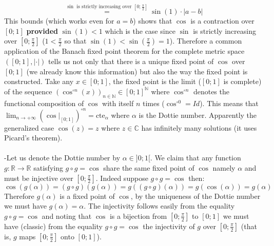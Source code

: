 \begin{solution}
\[    \]
    \[
        \overset{\sin\text{ is strictly increasing over } \left[0;\frac{\pi}{2}\right]}{=}\sin\left(1\right)\cdot|a-b|
    \]
    This bounds (which works even for \( a=b \)) shows that \( \cos \) is a contraction over \( \left[0;1\right] \) \textbf{provided} \( \sin\left(1\right)<1 \) which is the case since \( \sin \) is strictly increasing over \( \left[0;\frac{\pi}{2}\right] \) (\( 1<\frac{\pi}{2} \) so that \( \sin\left(1\right)<\sin\left(\frac{\pi}{2}\right)=1 \)). Therefore a common application of the Banach fixed point theorem for the complete metric space \( \left(\left[0;1\right],|\cdot|\right) \) tells us not only that there is a unique fixed point of \( \cos \) over \( \left[0;1\right] \) (we already know this information) but also the way the fixed point is constructed. Take any \( x\in\left[0;1\right] \), the fixed point is the limit (\( \left[0;1\right] \) is complete) of the sequence \( \left(\cos^{\circ n}\left(x\right)\right)_{n\in\mathbb{N}}\in\left[0;1\right]^{\mathbb{N}} \) where \( \cos^{\circ n} \) denotes the functional composition of \( \cos \) with itself \( n \) times (\( \cos^{\circ 0}=Id \)). This means that \( \lim _{n\rightarrow+\infty}\left(\cos|_{\left[0;1\right]}\right)^{\circ n}=\mathrm{cte}_{\alpha} \) where \( \alpha \) is the Dottie number. Apparently the generalized case \( \cos\left(z\right)=z \) where \( z\in\mathbb{C} \) has infinitely many solutions (it uses Picard's theorem).
    \\\\
    -Let us denote the Dottie number by \( \alpha\in]0;1[ \). We claim that any function \( g:\mathbb{R}\rightarrow\mathbb{R} \) satisfying \( g\circ g=\cos \) share the same fixed point of \( \cos \) namely \( \alpha \) and must be injective over \( \left[0;\frac{\pi}{2}\right] \). Indeed suppose \( g\circ g= \cos \) then:
    \[
        \cos\left(g\left(\alpha\right)\right)=\left(g\circ g\right)\left(g\left(\alpha\right)\right)=g\left(\left(g\circ g\right)\left(\alpha\right)\right)=g\left(\cos\left(\alpha\right)\right)=g\left(\alpha\right)
    \]
    Therefore \( g\left(\alpha\right) \) is a fixed point of \( \cos \), by the uniqueness of the Dottie number we must have \( g\left(\alpha\right)=\alpha \). The injectivity follows easily from the equality \( g\circ g=\cos \) and noting that \( \cos \) is a bijection from \( \left[0;\frac{\pi}{2}\right] \) to \( \left[0;1\right] \) we must have (classic) from the equality \( g\circ g=\cos \) the injectivity of \( g \) over \( \left[0;\frac{\pi}{2}\right] \) (that is, \( g \) maps \( \left[0;\frac{\pi}{2}\right] \) onto \( \left[0;1\right] \)).

\end{solution}
